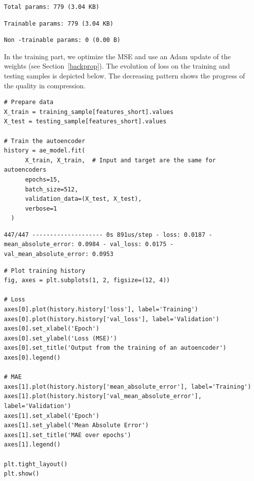 \begin{verbatim}
Total params: 779 (3.04 KB)
\end{verbatim}

\begin{verbatim}
Trainable params: 779 (3.04 KB)
\end{verbatim}

\begin{verbatim}
Non -trainable params: 0 (0.00 B)
\end{verbatim}

In the training part, we optimize the MSE and use an Adam update of the weights (see Section~\ref{backprop}). The evolution of loss on the training and testing samples is depicted below. The decreasing pattern shows the progress of the quality in compression.

\begin{verbatim}
# Prepare data
X_train = training_sample[features_short].values
X_test = testing_sample[features_short].values

# Train the autoencoder
history = ae_model.fit(                                                                           
      X_train, X_train,  # Input and target are the same for autoencoders                           
      epochs=15,                                                                                    
      batch_size=512,                                                                               
      validation_data=(X_test, X_test),                                                             
      verbose=1                                                                                     
  )
\end{verbatim}

\begin{verbatim}
447/447 -------------------- 0s 891us/step - loss: 0.0187 - mean_absolute_error: 0.0984 - val_loss: 0.0175 - val_mean_absolute_error: 0.0953
\end{verbatim}

\begin{verbatim}
# Plot training history
fig, axes = plt.subplots(1, 2, figsize=(12, 4))

# Loss
axes[0].plot(history.history['loss'], label='Training')
axes[0].plot(history.history['val_loss'], label='Validation')
axes[0].set_xlabel('Epoch')
axes[0].set_ylabel('Loss (MSE)')
axes[0].set_title('Output from the training of an autoencoder')
axes[0].legend()

# MAE
axes[1].plot(history.history['mean_absolute_error'], label='Training')
axes[1].plot(history.history['val_mean_absolute_error'], label='Validation')
axes[1].set_xlabel('Epoch')
axes[1].set_ylabel('Mean Absolute Error')
axes[1].set_title('MAE over epochs')
axes[1].legend()

plt.tight_layout()
plt.show()
\end{verbatim}

